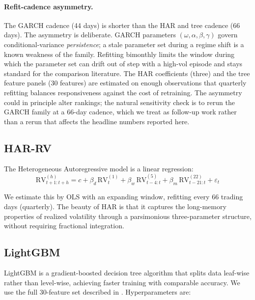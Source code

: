 \paragraph{Refit-cadence asymmetry.} {\sloppy
The GARCH cadence (44 days) is shorter than the HAR and tree cadence (66
days). The asymmetry is deliberate. GARCH parameters
$(\omega, \alpha, \beta, \gamma)$ govern conditional-variance
\emph{persistence}; a stale parameter set during a regime shift is a known
weakness of the family. Refitting bimonthly limits the window during
which the parameter set can drift out of step with a high-vol episode and
stays standard for the comparison literature. The HAR coefficients
(three) and the tree feature panels (30 features) are estimated on enough
observations that quarterly refitting balances responsiveness against the
cost of retraining. The asymmetry could in principle alter rankings; the
natural sensitivity check is to rerun the GARCH family at a 66-day
cadence, which we treat as follow-up work rather than a rerun that
affects the headline numbers reported here.\par}

\subsection{HAR-RV}

The Heterogeneous Autoregressive model \citep{Corsi2009} is a linear regression:
\begin{equation}
    \text{RV}_{t+1:t+h}^{(h)} = c + \beta_d \, \text{RV}_{t}^{(1)} + \beta_w \, \text{RV}_{t-4:t}^{(5)} + \beta_m \, \text{RV}_{t-21:t}^{(22)} + \varepsilon_t
\end{equation}

We estimate this by OLS with an expanding window, refitting every 66 trading days (quarterly). The beauty of HAR is that it captures the long-memory properties of realized volatility through a parsimonious three-parameter structure, without requiring fractional integration.

\subsection{LightGBM}

LightGBM \citep{Ke2017} is a gradient-boosted decision tree algorithm that splits data leaf-wise rather than level-wise, achieving faster training with comparable accuracy. We use the full 30-feature set described in . Hyperparameters are:

